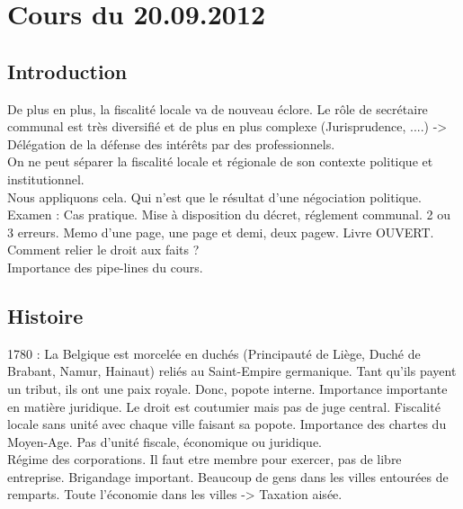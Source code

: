 \documentclass{book}
\begin{document}
\thispagestyle{empty}
\setcounter{page}{0}
\null
\newpage
{} \setcounter{page}{1} 




\tableofcontents



\chapter{Cours du 20.09.2012}
 \setcounter{page}{1} 

\section{Introduction}

De plus en plus, la fiscalité locale va de nouveau éclore. Le rôle de secrétaire communal est très diversifié et  de plus en plus complexe (Jurisprudence, ....) -> Délégation de la défense des intérêts par des professionnels.\\

On ne peut séparer la fiscalité locale et régionale de son contexte politique et institutionnel.\\

Nous appliquons cela. Qui n'est que le résultat d'une négociation politique.\\

Examen : Cas pratique. Mise à disposition du décret, réglement communal. 2 ou 3 erreurs. Memo d'une page, une page et demi, deux pagew. Livre OUVERT. Comment relier le droit aux faits ?\\

Importance des pipe-lines du cours.\\

\section{Histoire} 

1780 : La Belgique est morcelée en duchés (Principauté de Liège, Duché de Brabant, Namur, Hainaut) reliés au Saint-Empire germanique. Tant qu'ils payent un tribut, ils ont une paix royale. Donc, popote interne. Importance importante en matière juridique. Le droit est coutumier mais pas de juge central. Fiscalité locale sans unité avec chaque ville faisant sa popote. Importance des chartes du Moyen-Age. Pas d'unité fiscale, économique  ou juridique.\\

Régime des corporations. Il faut etre membre pour exercer, pas de libre entreprise. Brigandage important. Beaucoup de gens dans les villes entourées de remparts. Toute l'économie dans les villes -> Taxation aisée.\\
\end{document}
